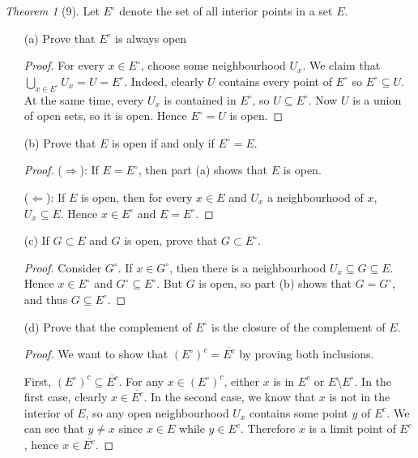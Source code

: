 \documentclass[12pt]{article}
\theoremstyle{remark}
\theoremstyle{named}
\newtheorem*{theorem}{Theorem}
\renewcommand{\implies}{\Rightarrow}
\newcommand{\coimplies}{\Leftarrow}
\begin{document}
\begin{theorem}[9]
    Let $E^\circ$ denote the set of all interior points in a set $E$. 
    \begin{enumerate}
        \item[(a)] Prove that $E^\circ$ is always open
        
        \begin{proof}
            For every $x \in E^\circ$, choose some neighbourhood $U_x$. We claim that $\bigcup_{x \in E^\circ} U_x = U = E^\circ$. Indeed, clearly $U$ contains every point of $E^\circ$ so $E^\circ \subseteq U$. At the same time, every $U_x$ is contained in $E^\circ$, so $U \subseteq E^\circ$. Now $U$ is a union of open sets, so it is open. Hence $E^\circ = U$ is open.
        \end{proof}

        \item[(b)] Prove that $E$ is open if and only if $E^\circ = E$.
        
        \begin{proof}
            ($\implies$): If $E = E^\circ$, then part (a) shows that $E$ is open. 
            
            ($\coimplies$): If $E$ is open, then for every $x \in E$ and $U_x$ a neighbourhood of $x$, $U_x \subseteq E$. Hence $x \in E^\circ$ and $E = E^\circ$.
        \end{proof}

        \item[(c)] If $G \subset E$ and $G$ is open, prove that $G \subset E^\circ$.
        
        \begin{proof}
            Consider $G^\circ$. If $x \in G^\circ$, then there is a neighbourhood $U_x \subseteq G \subseteq E$. Hence $x \in E^\circ$ and $G^\circ \subseteq E^\circ$. But $G$ is open, so part (b) shows that $G = G^\circ$, and thus $G \subseteq E^\circ$. 
        \end{proof}

        \item[(d)] Prove that the complement of $E^\circ$ is the closure of the complement of $E$.
        
        \begin{proof}
            We want to show that $(E^\circ)^c = \overline{E^c}$ by proving both inclusions. 

            First, $(E^\circ)^c \subseteq \overline{E^c}$. For any $x \in (E^\circ)^c$, either $x$ is in $E^c$ or $E \setminus E^\circ$. In the first case, clearly $x \in \overline{E^c}$. In the second case, we know that $x$ is not in the interior of $E$, so any open neighbourhood $U_x$ contains some point $y$ of $E^c$. We can see that $y \neq x$ since $x \in E$ while $y \in E^c$. Therefore $x$ is a limit point of $E^c$, hence $x \in \overline{E^c}$.
            

\end{proof}
\end{enumerate}
\end{theorem}
\end{document}
